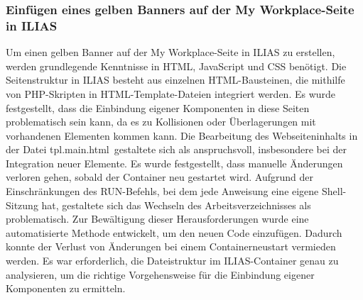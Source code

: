 \documentclass[10pt, a4paper,onecolumn ,titlepage]{article}
\begin{document}
    \subsubsection{Einfügen eines gelben Banners auf der \glqq My Workplace\grqq-Seite in ILIAS}
    \label{subsubsec:lessonslearnedHTTP}
    Um einen gelben Banner auf der \glqq My Workplace\grqq-Seite in ILIAS zu erstellen, werden grundlegende Kenntnisse in HTML, JavaScript und CSS benötigt.
    Die Seitenstruktur in ILIAS besteht aus einzelnen HTML-Bausteinen, die mithilfe von PHP-Skripten in HTML-Template-Dateien integriert werden.
    Es wurde festgestellt, dass die Einbindung eigener Komponenten in diese Seiten problematisch sein kann, da es zu Kollisionen oder Überlagerungen mit vorhandenen Elementen kommen kann.
    Die Bearbeitung des Webseiteninhalts in der Datei \glqq tpl.main.html\grqq\ gestaltete sich als anspruchsvoll, insbesondere bei der Integration neuer Elemente.
    Es wurde festgestellt, dass manuelle Änderungen verloren gehen, sobald der Container neu gestartet wird.
    Aufgrund der Einschränkungen des \glqq RUN\grqq-Befehls, bei dem jede Anweisung eine eigene Shell-Sitzung hat, gestaltete sich das Wechseln des Arbeitsverzeichnisses als problematisch.
    Zur Bewältigung dieser Herausforderungen wurde eine automatisierte Methode entwickelt, um den neuen Code einzufügen.
    Dadurch konnte der Verlust von Änderungen bei einem Containerneustart vermieden werden.
    Es war erforderlich, die Dateistruktur im ILIAS-Container genau zu analysieren, um die richtige Vorgehensweise für die Einbindung eigener Komponenten zu ermitteln.
\end{document}
